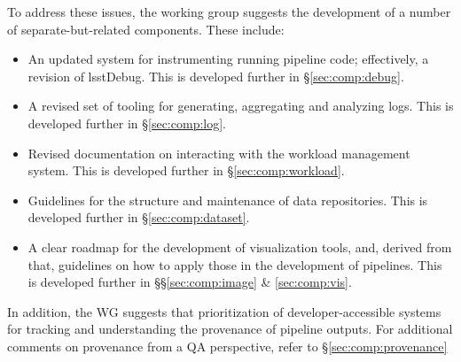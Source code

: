 To address these issues, the working group suggests the development of a
number of separate-but-related components. These include:

\begin{itemize}

  \item{An updated system for instrumenting running pipeline code;
  effectively, a revision of lsstDebug. This is developed further in
  \S\ref{sec:comp:debug}.}

  \item{A revised set of tooling for generating, aggregating and analyzing
  logs. This is developed further in \S\ref{sec:comp:log}.}

  \item{Revised documentation on interacting with the workload management
  system. This is developed further in \S\ref{sec:comp:workload}.}

  \item{Guidelines for the structure and maintenance of data repositories.
  This is developed further in \S\ref{sec:comp:dataset}.}

  \item{A clear roadmap for the development of visualization tools, and,
  derived from that, guidelines on how to apply those in the development of
  pipelines. This is developed further in \S\S\ref{sec:comp:image} \&
  \ref{sec:comp:vis}.}

\end{itemize}

In addition, the WG suggests that prioritization of developer-accessible
systems for tracking and understanding the provenance of pipeline outputs. For
additional comments on provenance from a QA perspective, refer to
\S\ref{sec:comp:provenance}

